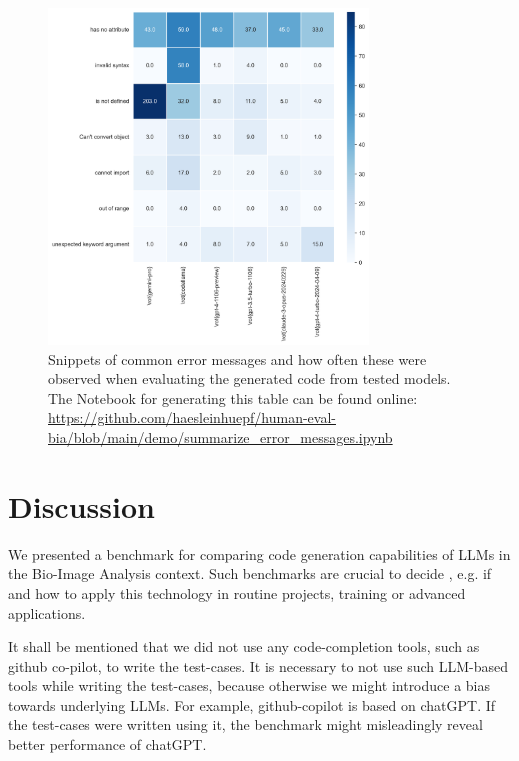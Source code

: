 \documentclass{ecai}
\begin{document}
\begin{figure}[h]
    \includegraphics[width=8.5cm]{error_counts_heatmap.png}
    \caption{Snippets of common error messages and how often these were observed when evaluating the generated code from tested models. The Notebook for generating this table can be found online: \url{https://github.com/haesleinhuepf/human-eval-bia/blob/main/demo/summarize_error_messages.ipynb} 
    \newline}
    \label{fig:commonerrors}
    \end{figure}


\section{Discussion}

We presented a benchmark for comparing code generation capabilities of LLMs in the Bio-Image Analysis context. Such benchmarks are crucial to decide , e.g. if and how to apply this technology in routine projects, training or advanced applications. 

It shall be mentioned that we did not use any code-completion tools, such as github co-pilot, to write the test-cases. It is necessary to not use such LLM-based tools while writing the test-cases, because otherwise we might introduce a bias towards underlying LLMs. For example, github-copilot is based on chatGPT. If the test-cases were written using it, the benchmark might misleadingly reveal better performance of chatGPT.
\end{document}
